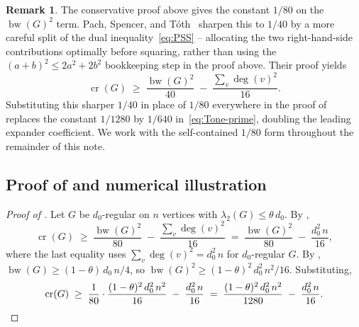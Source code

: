 \documentclass[11pt,a4paper]{article}
\theoremstyle{definition}
\newtheorem{remark}[theorem]{Remark}
\DeclareMathOperator{\crN}{cr}
\DeclareMathOperator{\bw}{bw}
\begin{document}
\begin{remark}\label{rem:PST-constants}
The conservative proof above gives the constant $1/80$ on the
$\bw(G)^{2}$ term. Pach, Spencer, and T\'oth~\cite[Section 4]{PachSpencerToth}
sharpen this to $1/40$ by a more careful split of the dual
inequality~\eqref{eq:PSS} -- allocating the two right-hand-side
contributions optimally before squaring, rather than using the
$(a + b)^{2} \le 2a^{2} + 2b^{2}$ bookkeeping step in the proof
above. Their proof yields
\[
   \crN(G) \;\ge\; \frac{\bw(G)^{2}}{40}
                 \;-\; \frac{\sum_v \deg(v)^{2}}{16}.
\]
Substituting this sharper $1/40$ in place of $1/80$ everywhere in
the proof of  replaces the constant $1/1280$
by $1/640$ in~\eqref{eq:Tone-prime}, doubling the leading expander
coefficient. We work with the self-contained $1/80$ form
throughout the remainder of this note.
\end{remark}

\subsection{Proof of \texorpdfstring{}{Theorem~\ref*{thm:main-spec}}
            and numerical illustration}\label{sec:proof-spec}

\begin{proof}[Proof of ]
Let $G$ be $d_0$-regular on $n$ vertices with
$\lambda_2(G) \le \theta\,d_0$. By ,
\[
   \crN(G) \;\ge\; \frac{\bw(G)^{2}}{80} \;-\; \frac{\sum_v \deg(v)^{2}}{16}
              \;=\; \frac{\bw(G)^{2}}{80} \;-\; \frac{d_0^{2}\,n}{16},
\]
where the last equality uses $\sum_v \deg(v)^{2} = d_0^{2}\,n$ for
$d_0$-regular $G$. By ,
$\bw(G) \ge (1 - \theta)\,d_0\,n / 4$, so
$\bw(G)^{2} \ge (1 - \theta)^{2}\,d_0^{2}\,n^{2} / 16$. Substituting,
\[
   \crN(G) \;\ge\; \frac{1}{80} \cdot \frac{(1 - \theta)^{2}\,d_0^{2}\,n^{2}}{16}
                 \;-\; \frac{d_0^{2}\,n}{16}
              \;=\; \frac{(1 - \theta)^{2}\,d_0^{2}\,n^{2}}{1280}
                 \;-\; \frac{d_0^{2}\,n}{16}.
\qedhere
\]
\end{proof}
\end{document}
